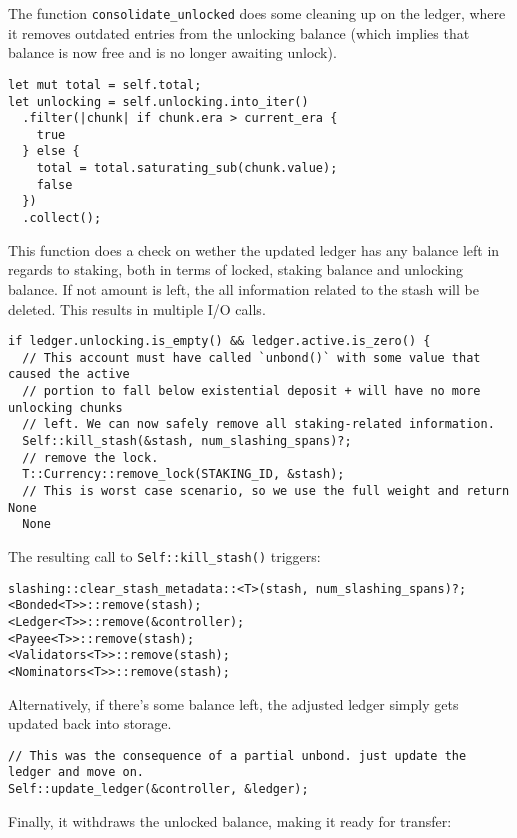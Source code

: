 \documentclass[11pt,a4paper]{article}
\begin{document}
The function \verb|consolidate_unlocked| does some cleaning up on the ledger, where
it removes outdated entries from the unlocking balance (which implies that
balance is now free and is no longer awaiting unlock).

\begin{verbatim}
let mut total = self.total;
let unlocking = self.unlocking.into_iter()
  .filter(|chunk| if chunk.era > current_era {
    true
  } else {
    total = total.saturating_sub(chunk.value);
    false
  })
  .collect();
\end{verbatim}

This function does a check on wether the updated ledger has any balance left in
regards to staking, both in terms of locked, staking balance and unlocking balance.
If not amount is left, the all information related to the stash will be deleted.
This results in multiple I/O calls.

\begin{verbatim}
if ledger.unlocking.is_empty() && ledger.active.is_zero() {
  // This account must have called `unbond()` with some value that caused the active
  // portion to fall below existential deposit + will have no more unlocking chunks
  // left. We can now safely remove all staking-related information.
  Self::kill_stash(&stash, num_slashing_spans)?;
  // remove the lock.
  T::Currency::remove_lock(STAKING_ID, &stash);
  // This is worst case scenario, so we use the full weight and return None
  None
\end{verbatim}

The resulting call to \verb|Self::kill_stash()| triggers:

\begin{verbatim}
slashing::clear_stash_metadata::<T>(stash, num_slashing_spans)?;
<Bonded<T>>::remove(stash);
<Ledger<T>>::remove(&controller);
<Payee<T>>::remove(stash);
<Validators<T>>::remove(stash);
<Nominators<T>>::remove(stash);
\end{verbatim}

Alternatively, if there's some balance left, the adjusted ledger simply gets
updated back into storage.

\begin{verbatim}
// This was the consequence of a partial unbond. just update the ledger and move on.
Self::update_ledger(&controller, &ledger);
\end{verbatim}

Finally, it withdraws the unlocked balance, making it ready for transfer:
\end{document}
